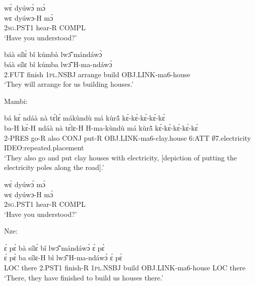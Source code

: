 \begin{exe} 
\exC\label{201}
  \glll wɛ̀ dyúwɔ́ mɔ̀ \\
       wɛ dyúwɔ-H mɔ̀ \\
      2\textsc{sg}.PST1 hear-R COMPL   \\
    \trans `Have you understood?'
\end{exe}

\begin{exe} 
\exC\label{202}
  \glll báà sílɛ̀ bî kúmbà lwɔ̃̂ mándáwɔ̀ \\
        báà sílɛ bî kúmba lwɔ̃̂ H-ma-ndáwɔ̀ \\
        2.FUT finish 1\textsc{pl}.NSBJ arrange build OBJ.LINK-ma6-house  \\
    \trans `They will arrange for us building houses.'
\end{exe}

\noindent Mambi:

\begin{exe} 
\exC\label{203} 
  \glll  bá kɛ́ ndáà nà tɛ́lɛ́ mákùndù má kùrã̂  kɛ́-kɛ́-kɛ́-kɛ́-kɛ́\\
         ba-H kɛ̀-H ndáà nà tɛ́lɛ-H H-ma-kùndù má kùrã̂  kɛ́-kɛ́-kɛ́-kɛ́-kɛ́ \\
        2-PRES go-R also CONJ put-R OBJ.LINK-ma6-clay.house 6:ATT $\emptyset$7.electricity IDEO:repeated.placement \\
    \trans `They also go and put clay houses with electricity, [depiction of putting the electricity poles along the road].'
\end{exe}

\begin{exe} 
\exC\label{204}
  \glll wɛ̀ dyúwɔ́ mɔ̀ \\
       wɛ dyúwɔ-H mɔ̀ \\
        2\textsc{sg}.PST1 hear-R COMPL  \\
    \trans `Have you understood?'
\end{exe}

\noindent Nze:

\begin{exe} 
\exC\label{205} 
  \glll ɛ́ pɛ̀ bà sílɛ́ bî lwɔ̃̂ mándáwɔ̀ ɛ́ pɛ̀ \\
        ɛ́ pɛ̀ ba sílɛ-H bî lwɔ̃̂ H-ma-ndáwɔ̀ ɛ́ pɛ̀  \\
        LOC there 2.PST1 finish-R 1\textsc{pl}.NSBJ build OBJ.LINK-ma6-house LOC there  \\
    \trans `There, they have finished to build us houses there.'
\end{exe}

